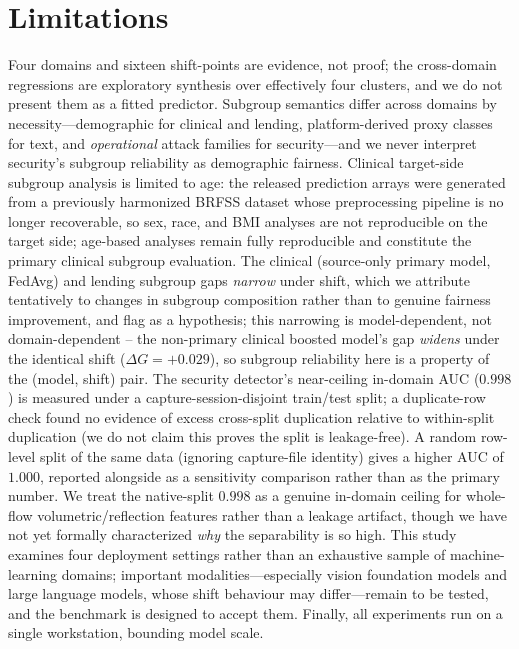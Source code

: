 \documentclass[11pt]{article}
\begin{document}
\section{Limitations}\label{sec:limitations}

Four domains and sixteen shift-points are evidence, not proof; the cross-domain regressions are
exploratory synthesis over effectively four clusters, and we do not present them as a fitted
predictor. Subgroup semantics differ across domains by necessity---demographic for clinical and
lending, platform-derived proxy classes for text, and \emph{operational} attack families for
security---and we never interpret security's subgroup reliability as demographic fairness.
Clinical target-side subgroup analysis is limited to age: the released prediction arrays were
generated from a previously harmonized BRFSS dataset whose preprocessing pipeline is no longer
recoverable, so sex, race, and BMI analyses are not reproducible on the target side; age-based
analyses remain fully reproducible and constitute the primary clinical subgroup evaluation. The
clinical (source-only primary model, FedAvg) and lending subgroup gaps \emph{narrow} under shift,
which we attribute tentatively to changes in subgroup composition rather than to genuine fairness
improvement, and flag as a hypothesis; this narrowing is model-dependent, not domain-dependent --
the non-primary clinical boosted model's gap \emph{widens} under the identical shift ($\Delta
G=+0.029$), so subgroup reliability here is a property of the (model, shift) pair. The security
detector's near-ceiling in-domain AUC ($0.998$) is measured under a capture-session-disjoint
train/test split; a duplicate-row check found no evidence of excess cross-split duplication
relative to within-split duplication (we do not claim this proves the split is leakage-free). A
random row-level split of the same data (ignoring capture-file identity) gives a higher AUC of
$1.000$, reported alongside as a sensitivity comparison rather than as the primary number. We
treat the native-split $0.998$ as a genuine in-domain ceiling for whole-flow volumetric/reflection
features rather than a leakage artifact, though we
have not yet formally characterized \emph{why} the separability is so high. This study
examines four deployment settings rather than an exhaustive sample of machine-learning domains;
important modalities---especially vision foundation models and large language models, whose shift
behaviour may differ---remain to be tested, and the benchmark is designed to accept them.
Finally, all experiments run on a single workstation, bounding model scale.
\end{document}

